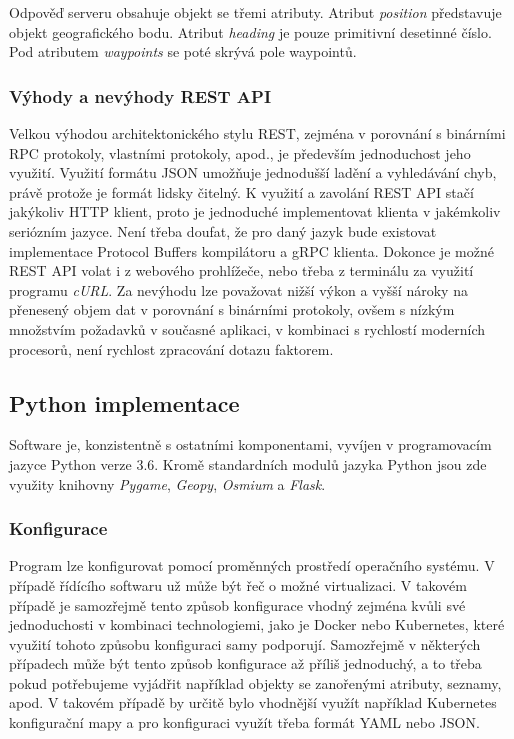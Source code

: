\documentclass[czech,bachelor,dept460,male,cpp,cpdeclaration]{diploma}
\begin{document}
Odpověď serveru obsahuje objekt se třemi atributy. Atribut \emph{position} představuje objekt geografického bodu. Atribut 
\emph{heading} je pouze primitivní desetinné číslo. Pod atributem \emph{waypoints} se poté skrývá pole waypointů.

\subsubsection{Výhody a nevýhody REST API}

Velkou výhodou architektonického stylu REST, zejména v porovnání s binárními RPC protokoly, vlastními protokoly, apod., je 
především jednoduchost jeho využití. Využití formátu JSON umožňuje jednodušší ladění a vyhledávání chyb, právě protože je formát
lidsky čitelný. K využití a zavolání REST API stačí jakýkoliv HTTP klient, proto je jednoduché implementovat klienta v jakémkoliv
seriózním jazyce. Není třeba doufat, že pro daný jazyk bude existovat implementace Protocol Buffers kompilátoru a gRPC klienta. 
Dokonce je možné REST API volat i z webového prohlížeče, nebo třeba z terminálu za využití programu \emph{cURL}. Za nevýhodu lze
považovat nižší výkon a vyšší nároky na přenesený objem dat v porovnání s binárními protokoly, ovšem s nízkým množstvím požadavků
v současné aplikaci, v kombinaci s rychlostí moderních procesorů, není rychlost zpracování dotazu faktorem.

\subsection{Python implementace}

Software je, konzistentně s ostatními komponentami, vyvíjen v programovacím jazyce Python verze 3.6. Kromě standardních modulů 
jazyka Python jsou zde využity knihovny \emph{Pygame}, \emph{Geopy}, \emph{Osmium} a \emph{Flask}.

\subsubsection{Konfigurace}

Program lze konfigurovat pomocí proměnných prostředí operačního systému. V případě řídícího softwaru už může být řeč o možné
virtualizaci. V takovém případě je samozřejmě tento způsob konfigurace vhodný zejména kvůli své jednoduchosti v kombinaci 
technologiemi, jako je Docker nebo Kubernetes, které využití tohoto způsobu konfiguraci samy podporují. Samozřejmě v některých 
případech může být tento způsob konfigurace až příliš jednoduchý, a to třeba pokud potřebujeme vyjádřit například objekty 
se zanořenými atributy, seznamy, apod. V takovém případě by určitě bylo vhodnější využít například Kubernetes konfigurační mapy 
a pro konfiguraci využít třeba formát YAML nebo JSON.
\end{document}

